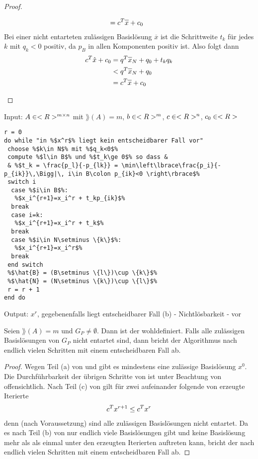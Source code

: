 \begin{proof}
\begin{enumerate}[label=(\alph*)]
\begin{align}
			&= c^T\overline{x} + c_0 \notag
		\end{align}
		Bei einer nicht entarteten zulässigen Basislösung $\overline{x}$ ist die Schrittweite $t_k$ für jedes $k$ mit $q_k<0$ positiv, da $p_B$ in allen Komponenten positiv ist. Also folgt dann
		\begin{align}
			c^T\hat{x}+c_0 &= q^T\overline{x}_N + q_0 + t_kq_k \notag \\
			&< q^T\overline{x}_N + q_0 \notag \\
			&= c^T\overline{x} + c_0 \notag
		\end{align}
	\end{enumerate}
\end{proof}

\begin{algorithm}
	Input: $A\in<R>^{m\times n}$ mit $\rang(A)=m$, $b\in<R>^m$, $c\in<R>^n$, $c_0\in<R>$
	\begin{lstlisting}
r = 0
do while "in %$x^r$% liegt kein entscheidbarer Fall vor"
 choose %$k\in N$% mit %$q_k<0$%
 compute %$l\in B$% und %$t_k\ge 0$% so dass &
 & %$t_k = \frac{p_l}{-p_{lk}} = \min\left\lbrace\frac{p_i}{-p_{ik}}\,\Bigg|\, i\in B\colon p_{ik}<0 \right\rbrace$%
 switch i
  case %$i\in B$%:
   %$x_i^{r+1}=x_i^r + t_kp_{ik}$%
  break
  case i=k:
   %$x_i^{r+1}=x_i^r + t_k$%
  break
  case %$i\in N\setminus \{k\}$%:
   %$x_i^{r+1}=x_i^r$%
  break
 end switch
 %$\hat{B} = (B\setminus \{l\})\cup \{k\}$%
 %$\hat{N} = (N\setminus \{k\})\cup \{l\}$%
 r = r + 1
end do
	\end{lstlisting}
	Output: $x^r$, gegebenenfalls liegt entscheidbarer Fall (b) - Nichtlösbarkeit - vor
\end{algorithm}

\begin{proposition}
	Seien $\rang(A)=m$ und $G_P\neq\emptyset$. Dann ist der  wohldefiniert. Falls alle zulässigen Basislösungen von $G_P$ nicht entartet sind, dann bricht der Algorithmus nach endlich vielen Schritten mit einem entscheidbaren Fall ab.
\end{proposition}
\begin{proof}
	Wegen Teil (a) von  und  gibt es mindestens eine zulässige Basislösung $x^0$. Die Durchführbarkeit der übrigen Schritte von  ist unter Beachtung von  offensichtlich. Nach Teil (c) von  gilt für zwei aufeinander folgende von  erzeugte Iterierte 
	\begin{align}
		c^Tx^{r+1} \le c^T x^r \notag
	\end{align}
	denn (nach Voraussetzung) sind alle zulässigen Basislösungen nicht entartet. Da es nach Teil (b) von  nur endlich viele Basislösungen gibt und keine Basislösung mehr als als einmal unter den erzeugten Iterierten auftreten kann, bricht der  nach endlich vielen Schritten mit einem entscheidbaren Fall ab.
\end{proof}

